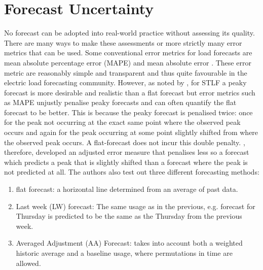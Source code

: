 %
%
%



\section{Forecast Uncertainty}

No forecast can be adopted into real-world practice without assessing its quality. There are many ways to make these assessments or more strictly many error metrics that can be used. %
Some conventional error metrics for load forecasts are mean absolute percentage error (MAPE) and mean absolute error \citep{hong16}. These error metric are reasonably simple and transparent and thus quite favourable in the electric load forecasting community. However, as noted by \cite{dan14}, for STLF a peaky forecast is more desirable and realistic than a flat forecast but error metrics such as MAPE unjustly penalise peaky forecasts and can often quantify the flat forecast to be better. This is because the peaky forecast is penalised twice: once for the peak not occurring at the exact same point where the observed peak occurs and again for the peak occurring at some point slightly shifted from where the observed peak occurs. A flat-forecast does not incur this double penalty. \citet{dan14}, therefore, developed an adjusted error measure that penalises less so a forecast which predicts a peak that is slightly shifted than a forecast where the peak is not predicted at all. The authors also test out three different forecasting methods:
\begin{enumerate}
\item flat forecast: a horizontal line determined from an average of past data.
\item Last week (LW) forecast: The same usage as in the previous, e.g. forecast for Thursday is predicted to be the same as the Thursday from the previous week.
\item Averaged Adjustment (AA) Forecast: takes into account both a weighted historic average and a baseline usage, where permutations in time are allowed.
\end{enumerate}


